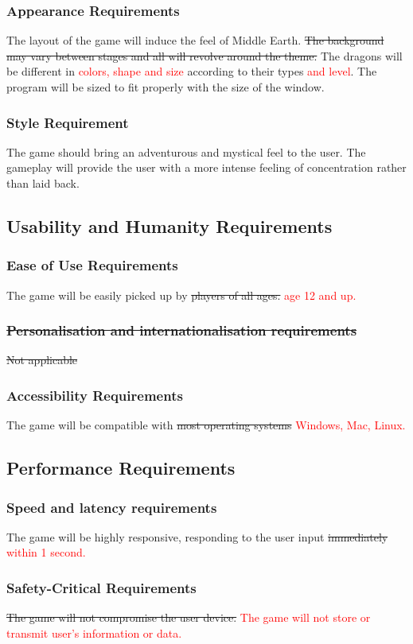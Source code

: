 \documentclass{article}
\begin{document}
\subsubsection{Appearance Requirements}
The layout of the game will induce the feel of Middle Earth. \st{The background may vary between stages and all will revolve around the theme.} The dragons will be different in  \textcolor{red}{colors, shape and size} according to their types \textcolor{red}{and level}. The program will be sized to fit properly with the size of the window.
\subsubsection{Style Requirement}
The game should bring an adventurous and mystical feel to the user. The gameplay will provide the user with a more intense feeling of concentration rather than laid back.

\subsection{Usability and Humanity Requirements}
\subsubsection{Ease of Use Requirements}
The game will be easily picked up by \st{players of all ages.} \textcolor{red}{age 12 and up.}
\subsubsection{\sout{Personalisation and internationalisation requirements}}
\st{Not applicable}
\subsubsection{Accessibility Requirements}
The game will be compatible with \st{most operating systems} \textcolor{red}{Windows, Mac, Linux.}

\subsection{Performance Requirements}
\subsubsection{Speed and latency requirements}
The game will be highly responsive, responding to the user input \st{immediately} \textcolor{red}{within 1 second.}
\subsubsection{Safety-Critical Requirements}
\st{The game will not compromise the user device.} \textcolor{red}{The game will not store or transmit user's information or data.}
\end{document}
